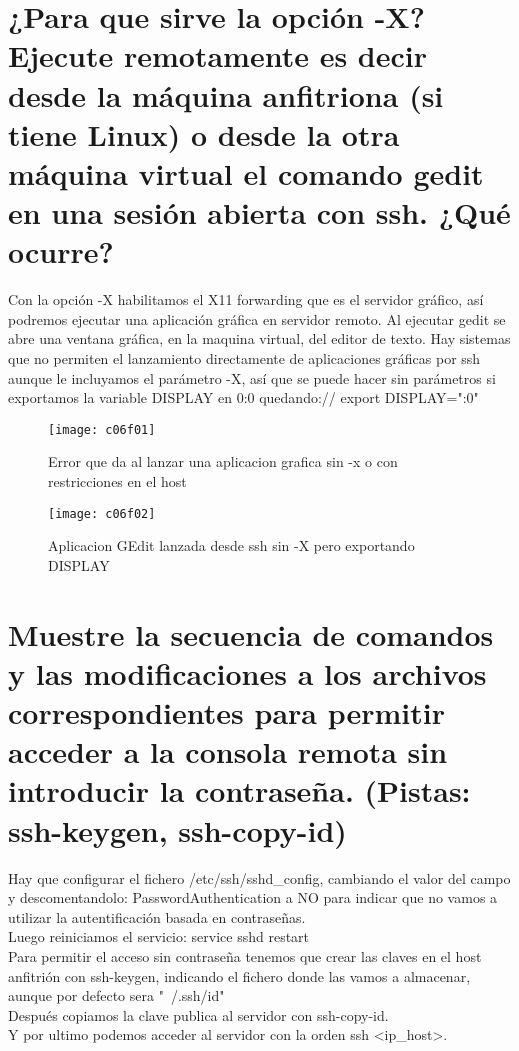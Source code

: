 \section{¿Para que sirve la opción -X? Ejecute remotamente es decir  desde la máquina anfitriona (si tiene Linux) o desde la otra máquina virtual el comando gedit en una sesión abierta con ssh. ¿Qué ocurre? \cite{06c01}}


Con la opción -X habilitamos el X11 forwarding que es el servidor gráfico, así podremos ejecutar una aplicación gráfica en servidor remoto.
Al ejecutar gedit se abre una ventana gráfica, en la maquina virtual, del editor de texto.
Hay sistemas que no permiten el lanzamiento directamente de aplicaciones gráficas por ssh aunque le incluyamos el parámetro -X, así que se puede hacer sin parámetros si exportamos la variable DISPLAY en 0:0 quedando://
export DISPLAY=":0"\\

\begin{figure}[H]
	\centering
	\texttt{[image: c06f01]}
	\caption{Error que da al lanzar una aplicacion grafica sin -x o con restricciones en el host}
	\label{fig:c06f01}
\end{figure}

\begin{figure}[H]
	\centering
	\texttt{[image: c06f02]}
	\caption{Aplicacion GEdit lanzada desde ssh sin -X pero exportando DISPLAY}
	\label{fig:c06f02}
\end{figure}

\section{Muestre la secuencia de comandos y las modificaciones a los archivos correspondientes para permitir acceder a la consola remota sin introducir la contraseña. (Pistas: ssh-keygen, ssh-copy-id) \cite{07c01}}	

Hay que configurar el fichero  /etc/ssh/sshd\_config, cambiando el valor del campo y descomentandolo: PasswordAuthentication a NO para indicar que no vamos a utilizar la autentificación basada en contraseñas.\\
Luego reiniciamos el servicio: service sshd restart \\
Para permitir el acceso sin contraseña tenemos que crear las claves en el host anfitrión con ssh-keygen, indicando el fichero donde las vamos a almacenar, aunque por defecto sera "~/.ssh/id"\\
Después copiamos la clave publica al servidor con ssh-copy-id.\\
Y por ultimo podemos acceder al servidor con la orden ssh <ip\_host>.

